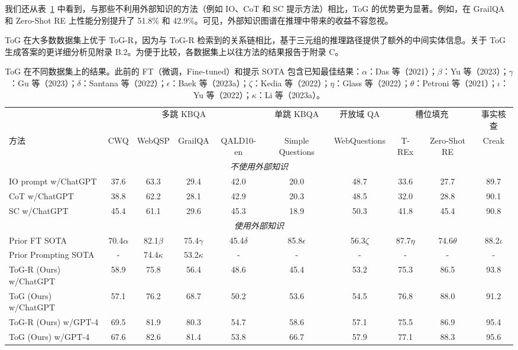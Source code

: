 \documentclass[11pt,UTF8,fontset=fandol]{ctexart}
\begin{document}
我们还从表~\ref{tab:1} 中看到，与那些不利用外部知识的方法（例如 IO、CoT 和 SC 提示方法）相比，ToG 的优势更为显著。例如，在 GrailQA 和 Zero-Shot RE 上性能分别提升了 51.8\% 和 42.9\%。可见，外部知识图谱在推理中带来的收益不容忽视。

ToG 在大多数数据集上优于 ToG-R，因为与 ToG-R 检索到的关系链相比，基于三元组的推理路径提供了额外的中间实体信息。关于 ToG 生成答案的更详细分析见附录 B.2。为便于比较，各数据集上以往方法的结果报告于附录 C。

\begin{table}[H]\centering
\caption{ToG 在不同数据集上的结果。此前的 FT（微调，Fine-tuned）和提示 SOTA 包含已知最佳结果：$\alpha$：Das 等（2021）；$\beta$：Yu 等（2023）；$\gamma$：Gu 等（2023）；$\delta$：Santana 等（2022）；$\epsilon$：Baek 等（2023a）；$\zeta$：Kedia 等（2022）；$\eta$：Glass 等（2022）；$\theta$：Petroni 等（2021）；$\iota$：Yu 等（2022）；$\kappa$：Li 等（2023a）。}
\label{tab:1}
\footnotesize
\setlength{\tabcolsep}{3pt}
\begin{tabular}{lccccccccc}
\toprule
& \multicolumn{4}{c}{多跳 KBQA} & 单跳 KBQA & 开放域 QA & \multicolumn{2}{c}{槽位填充} & 事实核查 \\
\cmidrule(lr){2-5}\cmidrule(lr){6-6}\cmidrule(lr){7-7}\cmidrule(lr){8-9}\cmidrule(lr){10-10}
方法 & CWQ & WebQSP & GrailQA & QALD10-en & Simple Questions & WebQuestions & T-REx & Zero-Shot RE & Creak \\
\midrule
\multicolumn{10}{c}{\textit{不使用外部知识}} \\
IO prompt w/ChatGPT & 37.6 & 63.3 & 29.4 & 42.0 & 20.0 & 48.7 & 33.6 & 27.7 & 89.7 \\
CoT w/ChatGPT & 38.8 & 62.2 & 28.1 & 42.9 & 20.3 & 48.5 & 32.0 & 28.8 & 90.1 \\
SC w/ChatGPT & 45.4 & 61.1 & 29.6 & 45.3 & 18.9 & 50.3 & 41.8 & 45.4 & 90.8 \\
\midrule
\multicolumn{10}{c}{\textit{使用外部知识}} \\
Prior FT SOTA & 70.4$\alpha$ & 82.1$\beta$ & 75.4$\gamma$ & 45.4$\delta$ & 85.8$\epsilon$ & 56.3$\zeta$ & 87.7$\eta$ & 74.6$\theta$ & 88.2$\iota$ \\
Prior Prompting SOTA & - & 74.4$\kappa$ & 53.2$\kappa$ & - & - & - & - & - & - \\
ToG-R (Ours) w/ChatGPT & 58.9 & 75.8 & 56.4 & 48.6 & 45.4 & 53.2 & 75.3 & 86.5 & 93.8 \\
ToG (Ours) w/ChatGPT & 57.1 & 76.2 & 68.7 & 50.2 & 53.6 & 54.5 & 76.8 & 88.0 & 91.2 \\
ToG-R (Ours) w/GPT-4 & 69.5 & 81.9 & 80.3 & 54.7 & 58.6 & 57.1 & 75.5 & 86.9 & 95.4 \\
ToG (Ours) w/GPT-4 & 67.6 & 82.6 & 81.4 & 53.8 & 66.7 & 57.9 & 77.1 & 88.3 & 95.6 \\
\bottomrule
\end{tabular}
\end{table}
\end{document}
